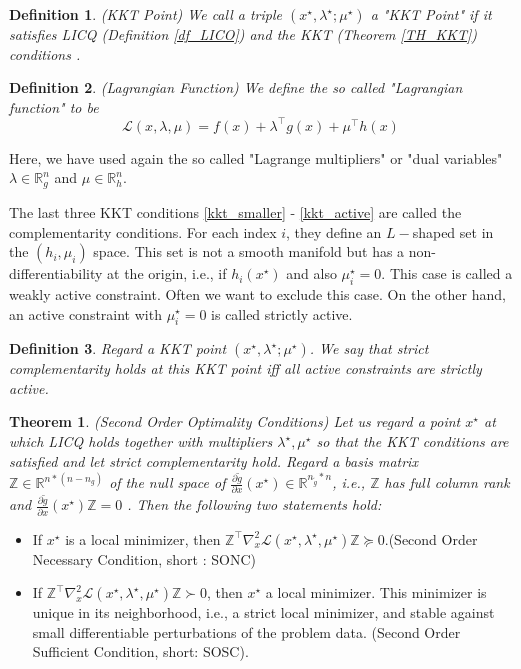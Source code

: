 \documentclass  [
  paper    = a4,
  BCOR     = 10mm,
  twoside,
  fontsize = 12pt,
  fleqn,
  toc      = bibnumbered,
  toc      = listofnumbered,
  numbers  = noendperiod,
  headings = normal,
  listof   = leveldown,
  version  = 3.03
]                                       {scrreprt}
\newcommand{\<}{\langle}
\renewcommand{\>}{\rangle}
\newtheorem{theorem}{Theorem}
\newtheorem{definition}{Definition}
\begin{document}
\begin{definition}(KKT Point)
We call a triple $(x^\star, \lambda^\star; \mu^\star)$ a "KKT Point" if it satisfies LICQ  (Definition \ref{df_LICO}) and the KKT (Theorem \ref{TH_KKT}) conditions .
\end{definition}


\begin{definition}(Lagrangian Function)
We define the so called "Lagrangian function" to be
\begin{equation}
	\mathcal{L}(x,\lambda, \mu) = f(x) + \lambda^\top g(x) +  \mu^\top h(x) 
	\label{eq_Lagrangian}
\end{equation}
\end{definition}
Here, we have used again the so called "Lagrange multipliers" or "dual variables"  $\lambda \in \mathbb{R}^n_g$ and $\mu \in \mathbb{R}^n_h$. 

The last three KKT conditions \ref{kkt_smaller} - \ref{kkt_active} are called the complementarity conditions. For each index $i$, they define an $L-$shaped set in the $(h_i, \mu_i)$ space. This set is not a smooth manifold but has a non-differentiability at the origin, i.e., if  $h_i(x^\star)$ and also $\mu_i^\star = 0$. This case is called a weakly active constraint. Often we want to exclude this case. On the other hand, an active constraint with $\mu_i^\star = 0$ is called strictly active.
\begin{definition}
	Regard a KKT point $(x^\star, \lambda^\star; \mu^\star)$. We say that strict complementarity holds at this KKT point iff all	active constraints are strictly active.
\end{definition}

\begin{theorem}(Second Order Optimality Conditions) Let us regard a point $x^\star$ at which LICQ holds together with
multipliers $\lambda^\star, \mu^\star$ so that the KKT conditions are satisfied and let strict complementarity hold. Regard a basis matrix $\mathbb{Z} \in  \mathbb{R}^{n*(n-n_g)}$ of the null space of $\frac{\partial \tilde{g}}{\partial x} (x^\star) \in \mathbb{R}^{n_{\tilde{g}} *n}$, i.e., $\mathbb{Z}$ has full column rank and $\frac{\partial \tilde{g}}{\partial x} (x^\star)\mathbb{Z} =0$ .
Then the following two statements hold:
\end{theorem}
\begin{itemize}
\item  If $x^\star$ is a local minimizer, then $\mathbb{Z}^\top \nabla_x^2 \mathcal{L}(x^\star, \lambda^\star, \mu^\star)\mathbb{Z} \succeq 0  $.(Second Order Necessary Condition, short : SONC)
\item  If $\mathbb{Z}^\top \nabla_x^2 \mathcal{L}(x^\star, \lambda^\star, \mu^\star)\mathbb{Z} \succ 0 $, then $x^\star$ a local minimizer. This minimizer is unique in its neighborhood, i.e., a strict local minimizer, and stable against small differentiable perturbations of the problem data. (Second Order Sufficient Condition, short: SOSC).
\end{itemize}
\end{document}
